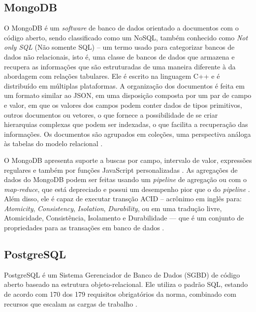 \subsection{MongoDB}
\label{subsec:mongo}
O MongoDB é um \textit{software} de banco de dados orientado a documentos com o código aberto, sendo classificado como um NoSQL, também conhecido como \textit{Not only SQL} (Não somente SQL) – um termo usado para categorizar bancos de dados não relacionais, isto é, uma classe de bancos de dados que armazena e recupera as informações que são estruturadas de uma maneira diferente à da abordagem com relações tabulares. Ele é escrito na linguagem C++ e é distribuído em múltiplas plataformas. A organização dos documentos é feita em um formato similar ao JSON, em uma disposição composta por um par de campo e valor, em que os valores dos campos podem conter dados de tipos primitivos, outros documentos ou vetores, o que fornece a possibilidade de se criar hierarquias complexas que podem ser indexadas, o que facilita a recuperação das informações. Os documentos são agrupados em coleções, uma perspectiva análoga às tabelas do modelo relacional \cite{mongoDB2021}.

O MongoDB apresenta suporte a buscas por campo, intervalo de valor, expressões regulares e também por funções JavaScript personalizadas \cite{mongoDB2021}. As agregações de dados do MongoDB podem ser feitas usando um \textit{pipeline} de agregação ou com o \textit{map-reduce}, que está depreciado e possui um desempenho pior que o do \textit{pipeline} \cite{mongoDBagregacao}. Além disso, ele é capaz de executar transção ACID – acrônimo em inglês para: \textit{Atomicity}, \textit{Consistency}, \textit{Isolation}, \textit{Durability}, ou em uma tradução livre, Atomicidade, Consistência, Isolamento e Durabilidade — que é um conjunto de propriedades para as transações em banco de dados \cite{mongoDBACID}.


\subsection{PostgreSQL}
\label{subsec:postgres}
PostgreSQL é um Sistema Gerenciador de Banco de Dados (SGBD) de código aberto baseado na estrutura objeto-relacional. Ele utiliza o padrão SQL, estando de acordo com 170 dos 179 requisitos obrigatórios da norma, combinado com recursos que escalam as cargas de trabalho \cite{postgresAbout}.

